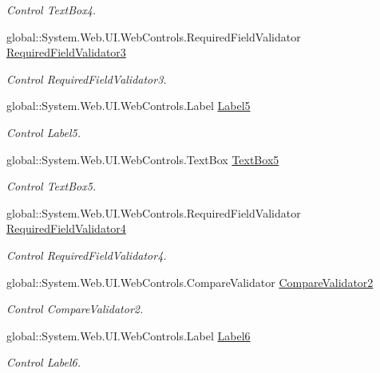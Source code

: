 \begin{DoxyCompactItemize}
\begin{DoxyCompactList}\small\item\em Control Text\+Box4. \end{DoxyCompactList}\item 
global\+::\+System.\+Web.\+U\+I.\+Web\+Controls.\+Required\+Field\+Validator \mbox{\hyperlink{class_inicio_1_1_registro_a24b35dd88cea1b27e18e681d9f1bd24a}{Required\+Field\+Validator3}}
\begin{DoxyCompactList}\small\item\em Control Required\+Field\+Validator3. \end{DoxyCompactList}\item 
global\+::\+System.\+Web.\+U\+I.\+Web\+Controls.\+Label \mbox{\hyperlink{class_inicio_1_1_registro_abe5ff1ad9dfeb25a9e673175b1aa828f}{Label5}}
\begin{DoxyCompactList}\small\item\em Control Label5. \end{DoxyCompactList}\item 
global\+::\+System.\+Web.\+U\+I.\+Web\+Controls.\+Text\+Box \mbox{\hyperlink{class_inicio_1_1_registro_a9bc70ac4aacbc0573d097586b9663f28}{Text\+Box5}}
\begin{DoxyCompactList}\small\item\em Control Text\+Box5. \end{DoxyCompactList}\item 
global\+::\+System.\+Web.\+U\+I.\+Web\+Controls.\+Required\+Field\+Validator \mbox{\hyperlink{class_inicio_1_1_registro_a50ab8ab72bcd7c32903c8af8acb766ea}{Required\+Field\+Validator4}}
\begin{DoxyCompactList}\small\item\em Control Required\+Field\+Validator4. \end{DoxyCompactList}\item 
global\+::\+System.\+Web.\+U\+I.\+Web\+Controls.\+Compare\+Validator \mbox{\hyperlink{class_inicio_1_1_registro_abb680432cdd29ebb5f813036c644dadc}{Compare\+Validator2}}
\begin{DoxyCompactList}\small\item\em Control Compare\+Validator2. \end{DoxyCompactList}\item 
global\+::\+System.\+Web.\+U\+I.\+Web\+Controls.\+Label \mbox{\hyperlink{class_inicio_1_1_registro_a1f4d81dd35af2a53cf1df120b4f9b383}{Label6}}
\begin{DoxyCompactList}\small\item\em Control Label6. \end{DoxyCompactList}\item 

\end{DoxyCompactItemize}
